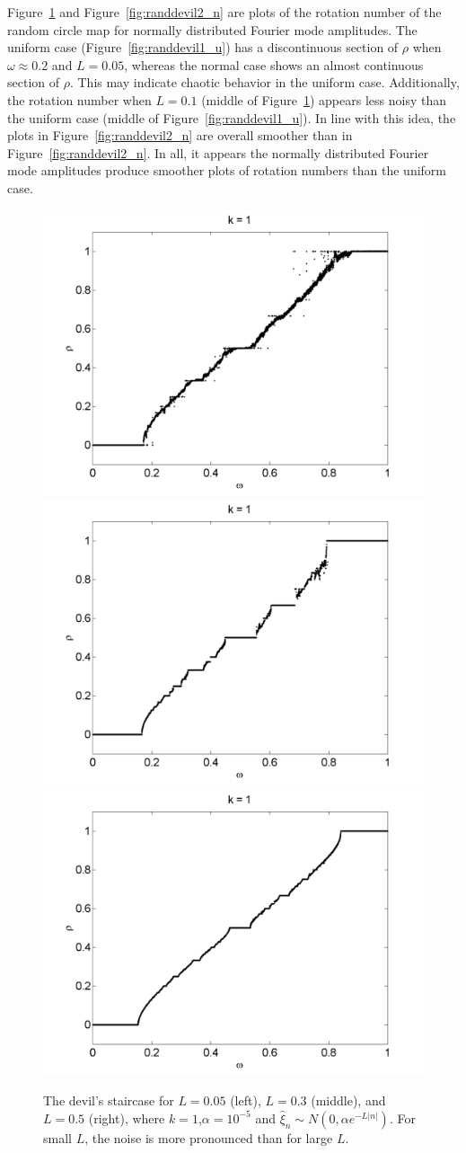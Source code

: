 Figure~\ref{fig:randdevil1_n} and Figure~\ref{fig:randdevil2_n} are
plots of the rotation number of the random circle map for normally
distributed Fourier mode amplitudes. The uniform case
(Figure~\ref{fig:randdevil1_u}) has a discontinuous section of $\rho$
when $\omega \approx 0.2$ and $L=0.05$, whereas the normal case shows
an almost continuous section of $\rho$. This may indicate chaotic
behavior in the uniform case. Additionally, the rotation number when
$L=0.1$ (middle of Figure~\ref{fig:randdevil1_n}) appears less noisy
than the uniform case (middle of
Figure~\ref{fig:randdevil1_u}). In line with this idea, the plots in
Figure~\ref{fig:randdevil2_n} are overall smoother than in
Figure~\ref{fig:randdevil2_n}. In all, it appears the normally
distributed Fourier mode amplitudes produce smoother plots of rotation
numbers than the uniform case.

\begin{figure}[H]\linespread{1}
\caption[The devil's staircase for the random circle map, varying $L$
(normal distribution), $\alpha = 10^{-5}$]{The devil's
  staircase for $L=0.05$ (left), $L=0.3$ (middle), and $L=0.5$ (right), where $k=1$,$\alpha = 10^{-5}$ and $\hat{\xi}_n\sim N(0,\alpha e^{-L|n|})$. For small $L$, the noise is more pronounced than for large $L$.}\label{fig:randdevil1_n}
\centering
\includegraphics[width=.33\textwidth]{figs/rcirc_n_devil_k1_L005.png}\hfill
\includegraphics[width=.33\textwidth]{figs/rcirc_n_devil_k1_L03.png}\hfill
\includegraphics[width=.33\textwidth]{figs/rcirc_n_devil_k1_L05.png}
\end{figure}

